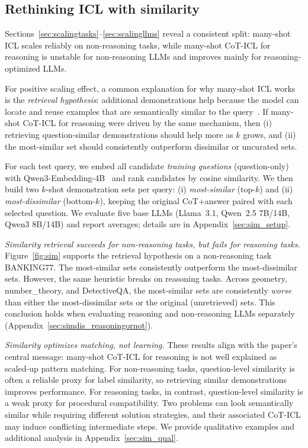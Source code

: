 \documentclass{llmxive}
\begin{document}
\subsection{Rethinking ICL with similarity} 
\label{sec:sim}

Sections~\ref{sec:scalingtasks}--\ref{sec:scalingllms} reveal a consistent split: many-shot ICL scales reliably on non-reasoning tasks, while many-shot CoT-ICL for reasoning is unstable for non-reasoning LLMs and improves mainly for reasoning-optimized LLMs.

For positive scaling effect, a common explanation for why many-shot ICL works is the \emph{retrieval hypothesis}: additional demonstrations help because the model can locate and reuse examples that are semantically similar to the query~\cite{liu-etal-2022-makes, wu-etal-2023-self}.
If many-shot CoT-ICL for reasoning were driven by the same mechanism, then (i) retrieving question-similar demonstrations should help more as $k$ grows, and (ii) the most-similar set should consistently outperform dissimilar or uncurated sets.

For each test query, we embed all candidate \emph{training questions} (question-only) with Qwen3-Embedding-4B~\cite{zhang2025qwen3embeddingadvancingtext} and rank candidates by cosine similarity.
We then build two $k$-shot demonstration sets per query: (i) \emph{most-similar} (top-$k$) and (ii) \emph{most-dissimilar} (bottom-$k$), keeping the original CoT+answer paired with each selected question.
We evaluate five base LLMs (Llama~3.1, Qwen~2.5 7B/14B, Qwen3 8B/14B) and report averages; details are in Appendix~\ref{sec:sim_setup}.

\emph{Similarity retrieval succeeds for non-reasoning tasks, but fails for reasoning tasks.}
Figure~\ref{fig:sim} supports the retrieval hypothesis on a non-reasoning task BANKING77. The most-similar sets consistently outperform the most-dissimilar sets.
However, the same heuristic breaks on reasoning tasks.
Across geometry, number\_theory, and DetectiveQA, the most-similar sets are consistently \emph{worse} than either the most-dissimilar sets or the original (unretrieved) sets.
This conclusion holds when evaluating reasoning and non-reasoning LLMs separately (Appendix~\ref{sec:simdis_reasoningornot}).

\emph{Similarity optimizes matching, not learning.}
These results align with the paper's central message: many-shot CoT-ICL for reasoning is not well explained as scaled-up pattern matching.
For non-reasoning tasks, question-level similarity is often a reliable proxy for label similarity, so retrieving similar demonstrations improves performance.
For reasoning tasks, in contrast, question-level similarity is a weak proxy for procedural compatibility. Two problems can look semantically similar while requiring different solution strategies, and their associated CoT-ICL may induce conflicting intermediate steps. We provide qualitative examples and additional analysis in Appendix~\ref{sec:sim_qual}.
\end{document}
